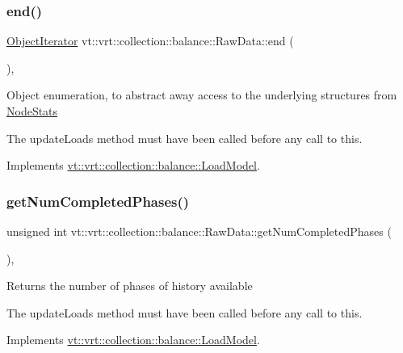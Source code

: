 \subsubsection{\texorpdfstring{end()}{end()}}
{\footnotesize\ttfamily \hyperlink{classvt_1_1vrt_1_1collection_1_1balance_1_1_object_iterator}{Object\+Iterator} vt\+::vrt\+::collection\+::balance\+::\+Raw\+Data\+::end (\begin{DoxyParamCaption}{ }\end{DoxyParamCaption})\hspace{0.3cm}{\ttfamily [override]}, {\ttfamily [virtual]}}

Object enumeration, to abstract away access to the underlying structures from \hyperlink{structvt_1_1vrt_1_1collection_1_1balance_1_1_node_stats}{Node\+Stats}

The {\ttfamily update\+Loads} method must have been called before any call to this. 

Implements \hyperlink{classvt_1_1vrt_1_1collection_1_1balance_1_1_load_model_a8474fb097bddbd75711e1e8d74084651}{vt\+::vrt\+::collection\+::balance\+::\+Load\+Model}.

\mbox{\label{structvt_1_1vrt_1_1collection_1_1balance_1_1_raw_data_a151f3230094feacd15015f51980b8e9e}} 
\subsubsection{\texorpdfstring{get\+Num\+Completed\+Phases()}{getNumCompletedPhases()}}
{\footnotesize\ttfamily unsigned int vt\+::vrt\+::collection\+::balance\+::\+Raw\+Data\+::get\+Num\+Completed\+Phases (\begin{DoxyParamCaption}{ }\end{DoxyParamCaption})\hspace{0.3cm}{\ttfamily [override]}, {\ttfamily [virtual]}}

Returns the number of phases of history available

The {\ttfamily update\+Loads} method must have been called before any call to this. 

Implements \hyperlink{classvt_1_1vrt_1_1collection_1_1balance_1_1_load_model_a999b155237ce8ba253019e783462a9aa}{vt\+::vrt\+::collection\+::balance\+::\+Load\+Model}.

